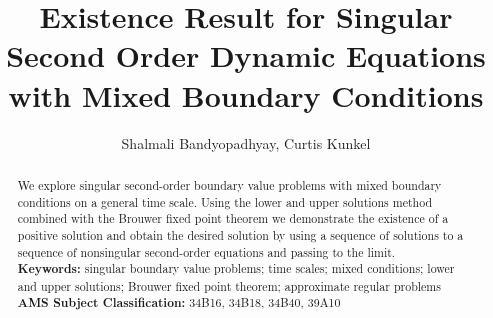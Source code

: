 \documentclass[12pt,reqno]{amsart}
\title[Positive Solns to Singular 2nd Order BVPs]{Existence Result for Singular Second Order Dynamic Equations with Mixed Boundary Conditions}
\author{Shalmali Bandyopadhyay, Curtis Kunkel}
\begin{document}
\begin{abstract} We explore singular second-order boundary value problems with mixed boundary conditions on a general time scale. Using the lower and upper solutions method combined with the Brouwer fixed point theorem we demonstrate the existence of a positive solution and obtain the desired solution by using a sequence of solutions to a sequence of nonsingular second-order equations and passing to the limit.  \\
\textbf{  Keywords:} singular boundary value problems; time scales; mixed conditions; lower and upper solutions; Brouwer fixed point theorem; approximate regular problems \\
\textbf{  AMS Subject Classification:} 34B16, 34B18, 34B40, 39A10  
\end{abstract}
\maketitle
\end{document}
